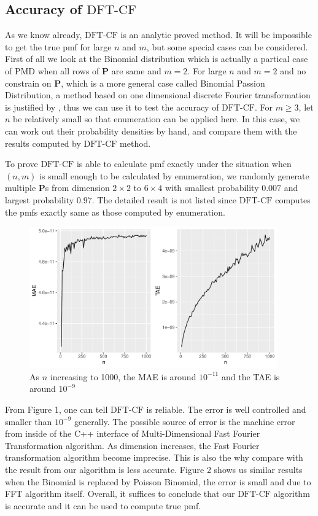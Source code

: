 \documentclass[12pt]{article}
\newcommand{\Pmat}{\mathbf{P}}
\newcommand{\PMD}{\textrm{PMD}}
\newcommand{\dft}{{\textrm{DFT-CF}}}
\begin{document}
\subsection{Accuracy of $\dft$}
As we know already, $\dft$ is an analytic proved method. It will be impossible to get the true pmf for large $n$ and $m$, but some special cases can be considered. First of all we look at the Binomial distribution which is actually a partical case of $\PMD$ when all rows of $\Pmat$ are same and $m=2$. For large $n$ and $m=2$ and no constrain on $\Pmat$, which is a more general case called Binomial Passion Distribution, a method based on one dimensional discrete Fourier transformation is justified by , thus we can use it to test the accuracy of $\dft$. For $m \geq 3$, let $n$ be relatively small so that enumeration can be applied here. In this case, we can work out their probability densities by hand, and compare them with the results computed by $\dft$ method.

To prove $\dft$ is able to calculate pmf exactly under the situation when $(n,m)$ is small enough to be calculated by enumeration, we randomly generate multiple $\Pmat$s from dimension $2 \times 2$ to $6 \times 4$ with smallest probability $0.007$ and largest probability $0.97$. The detailed result is not listed since $\dft$ computes the pmfs exactly same as those computed by enumeration.
\begin{figure}%
	\centering
	\includegraphics[width=0.95\textwidth]{figures/binom.pdf}
	\caption{ As $n$ increasing to 1000, the MAE is around $10^{-11}$ and the TAE is around $10^{-9}$}
	\label{fig: dft accuracy}
\end{figure}

From Figure 1, one can tell $\dft$ is reliable. The error is well controlled and smaller than $10^{-9}$ generally. The possible source of error is the machine error from inside of the C++ interface of Multi-Dimensional Fast Fourier Transformation algorithm. As dimension increases, the Fast Fourier transformation algorithm become imprecise. This is also the why compare with the result from  our algorithm is less accurate. Figure 2 shows us similar results when the Binomial is replaced by Poisson Binomial, the error is small and due to FFT algorithm itself. Overall, it suffices to conclude that our $\dft$ algorithm is accurate and it can be used to compute true pmf.
\end{document}
